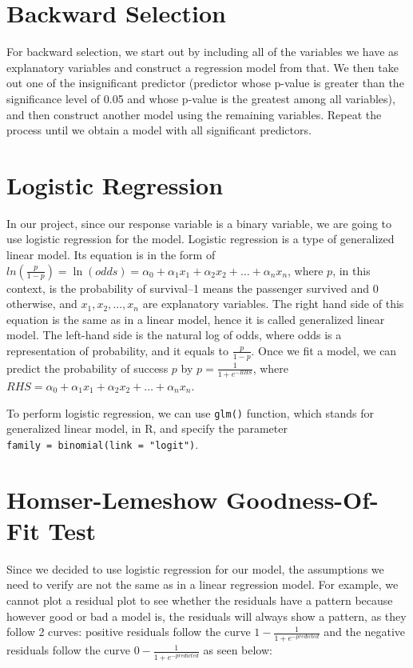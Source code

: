 \documentclass[12pt, oneside]{book}
\theoremstyle{definition}
\theoremstyle{definition}
\theoremstyle{definition}
\theoremstyle{remark}
\begin{document}
\hypertarget{backward-selection}{%
\section{Backward Selection}\label{backward-selection}}

For backward selection, we start out by including all of the variables
we have as explanatory variables and construct a regression model from
that. We then take out one of the insignificant predictor (predictor
whose p-value is greater than the significance level of 0.05 and whose
p-value is the greatest among all variables), and then construct another
model using the remaining variables. Repeat the process until we obtain
a model with all significant predictors.

\hypertarget{logistic-regression}{%
\section{Logistic Regression}\label{logistic-regression}}

In our project, since our response variable is a binary variable, we are
going to use logistic regression for the model. Logistic regression is a
type of generalized linear model. Its equation is in the form of
\(ln(\frac{p}{1-p})=\ln(odds)=\alpha_0+\alpha_1x_1+\alpha_2x_2+\dots +\alpha_nx_n\),
where \(p\), in this context, is the probability of survival--1 means
the passenger survived and 0 otherwise, and \(x_1, x_2, \dots, x_n\) are
explanatory variables. The right hand side of this equation is the same
as in a linear model, hence it is called generalized linear model. The
left-hand side is the natural log of odds, where odds is a
representation of probability, and it equals to \(\frac{p}{1-p}\). Once
we fit a model, we can predict the probability of success \(p\) by
\(p = \frac{1}{1+e^{-RHS}}\), where
\(RHS=\alpha_0+\alpha_1x_1+\alpha_2x_2+\dots +\alpha_nx_n\).

To perform logistic regression, we can use \texttt{glm()} function,
which stands for generalized linear model, in R, and specify the
parameter \texttt{family\ =\ binomial(link\ =\ "logit")}.

\hypertarget{homser-lemeshow-goodness-of-fit-test}{%
\section{Homser-Lemeshow Goodness-Of-Fit
Test}\label{homser-lemeshow-goodness-of-fit-test}}

Since we decided to use logistic regression for our model, the
assumptions we need to verify are not the same as in a linear regression
model. For example, we cannot plot a residual plot to see whether the
residuals have a pattern because however good or bad a model is, the
residuals will always show a pattern, as they follow 2 curves: positive
residuals follow the curve \(1 - \frac{1}{1+e^{-predicted}}\) and the
negative residuals follow the curve \(0 - \frac{1}{1+e^{-predicted}}\)
as seen below:
\end{document}
